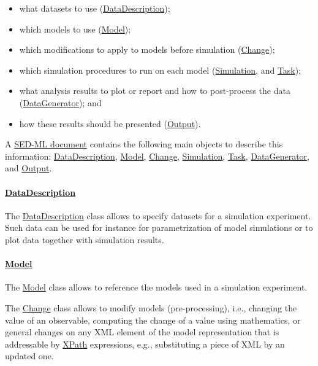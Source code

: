 \begin{itemize}
\item what datasets to use (\hyperref[class:dataDescription]{DataDescription});
\item which models to use (\hyperref[class:model]{Model});
\item which modifications to apply to models before simulation (\hyperref[class:change]{Change});
\item which simulation procedures to run on each model (\hyperref[class:simulation]{Simulation}, and \hyperref[class:task]{Task});
\item what analysis results to plot or report and how to post-process the data (\hyperref[class:dataGenerator]{DataGenerator}); and
\item how these results should be presented (\hyperref[class:output]{Output}).
\end{itemize}

A \hyperref[class:sed-ml]{SED-ML document} contains the following main objects to describe this information: \hyperref[class:dataDescription]{DataDescription}, \hyperref[class:model]{Model}, \hyperref[class:change]{Change}, \hyperref[class:simulation]{Simulation}, \hyperref[class:task]{Task}, \hyperref[class:dataGenerator]{DataGenerator}, and \hyperref[class:output]{Output}.

\paragraph*{\hyperref[class:dataDescription]{DataDescription}}
The \hyperref[class:dataDescription]{DataDescription} class allows to specify datasets for a simulation experiment. Such data can be used for instance for parametrization of model simulations or to plot data together with simulation results.

\paragraph*{\hyperref[class:model]{Model}}
The \hyperref[class:model]{Model} class allows to reference the models used in a simulation experiment.

The \hyperref[class:change]{Change} class allows to modify models (pre-processing), i.e., changing the value of an observable, computing the change of a value using mathematics, or general changes on any XML element of the model representation that is addressable by \hyperref[sec:xpath]{XPath} expressions, e.g., substituting a piece of XML by an updated one.


